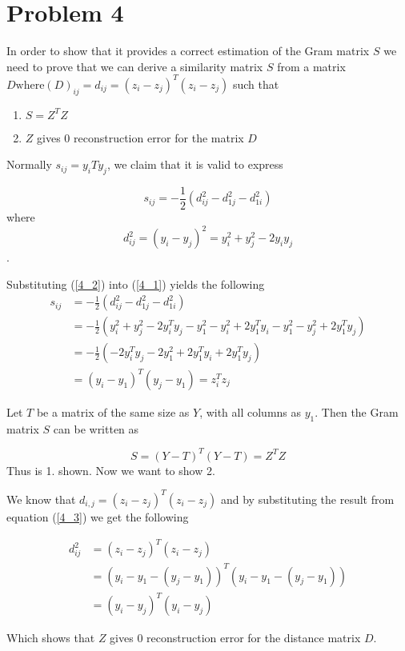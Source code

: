 \section*{Problem 4}

In order to show that it provides a correct estimation of the Gram matrix $S$ we need to prove that we can derive a similarity matrix $S$ from a matrix $D \text{where} (D)_{ij} = d_{ij} = (z_i - z_j)^T(z_i - z_j)$ such that
\begin{enumerate}
  \item  $S = Z^TZ$
  \item $Z$ gives $0$ reconstruction error for the matrix $D$
\end{enumerate}

Normally $s_{ij} = y_iT y_j$, we claim that it is valid to express

\begin{equation}
  s_{ij} = - \frac{1}{2} (d_{ij}^2-d_{1j}^2-d_{1i}^2)
  \label{4_1}
\end{equation}
where
\begin{equation}
  d_{ij}^2 = (y_i - y_j)^2 = y_i^2 + y_j^2 - 2y_i y_j
    \label{4_2}
\end{equation}.

Substituting (\ref{4_2}) into (\ref{4_1}) yields the following
\begin{align}
  s_{ij} & = -\frac{1}{2} (d_{ij}^2 - d_{1j}^2 - d_{1i}^2) \\
  & = - \frac{1}{2} (y_i^2 + y_j^2 -2y_i^Ty_j - y_1^2 - y_i^2 + 2y_1^Ty_i - y_1^2 - y_j^2 + 2y_1^Ty_j) \\
  & = - \frac{1}{2} (-2y_i^Ty_j - 2y_1^2 + 2y_1^Ty_i + 2y_1^Ty_j) \\
  & = (y_i - y_1)^T(y_j - y_1) = z_i^T z_j
  \label{4_3}
\end{align}

Let $T$ be a matrix of the same size as $Y$, with all columns as $y_1$. Then the Gram matrix $S$ can be written as

\begin{equation}
  S = (Y-T)^T(Y-T) = Z^T Z
\end{equation}
Thus is 1. shown. Now we want to show 2.

We know that $d_{i,j} = (z_i - z_j)^T(z_i - z_j)$ and by substituting the result from equation (\ref{4_3}) we get the following

\begin{align}
  d_{ij}^2 & = (z_i - z_j)^T(z_i - z_j) \\
  & = (y_i - y_1 - (y_j - y_1))^T(y_i - y_1 - (y_j - y_1)) \\
  & = (y_i - y_j)^T(y_i - y_j)
\end{align}

Which shows that $Z$ gives $0$ reconstruction error for the distance matrix $D$.

